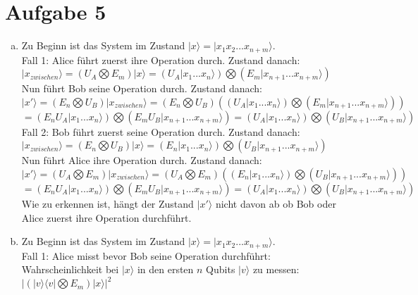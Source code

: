 \documentclass[a4paper]{scrartcl}
\begin{document}
\section*{Aufgabe 5}
\begin{enumerate}[a)]

\item Zu Beginn ist das System im Zustand $|x\rangle =|x_1x_2...x_{n+m}\rangle$. \\
Fall 1: Alice führt zuerst ihre Operation durch. Zustand danach:\\
$|x_{zwischen}\rangle=(U_A\bigotimes E_{m})|x\rangle = (U_A|x_1...x_n\rangle)\bigotimes (E_{m}|x_{n+1}...x_{n+m}\rangle)$\\
Nun führt Bob seine Operation durch. Zustand danach:\\
$|x'\rangle = (E_n\bigotimes U_B)|x_{zwischen}\rangle= (E_n\bigotimes U_B) ((U_A|x_1...x_n\rangle)\bigotimes (E_{m}|x_{n+1}...x_{n+m}\rangle))$\\
$= (E_nU_A|x_1...x_n\rangle)\bigotimes (E_mU_B|x_{n+1}...x_{n+m}\rangle)=(U_A|x_1...x_n\rangle)\bigotimes (U_B|x_{n+1}...x_{n+m}\rangle) $\\

\noindent Fall 2: Bob führt zuerst seine Operation durch. Zustand danach:\\
$|x_{zwischen}\rangle=(E_n \bigotimes U_B)|x\rangle = (E_n|x_1...x_n\rangle)\bigotimes (U_B|x_{n+1}...x_{n+m}\rangle)$\\
Nun führt Alice ihre Operation durch. Zustand danach:\\
$|x'\rangle = (U_A\bigotimes E_m)|x_{zwischen}\rangle= (U_A\bigotimes E_m) ((E_n|x_1...x_n\rangle)\bigotimes (U_B|x_{n+1}...x_{n+m}\rangle))$\\
$= (E_nU_A|x_1...x_n\rangle)\bigotimes (E_mU_B|x_{n+1}...x_{n+m}\rangle)=(U_A|x_1...x_n\rangle)\bigotimes (U_B|x_{n+1}...x_{n+m}\rangle)$\\
Wie zu erkennen ist, hängt der Zustand $|x'\rangle$ nicht davon ab ob Bob oder Alice zuerst ihre Operation durchführt.

\item Zu Beginn ist das System im Zustand $|x\rangle =|x_1x_2...x_{n+m}\rangle$. \\
Fall 1: Alice misst bevor Bob seine Operation durchführt:\\
Wahrscheinlichkeit bei $|x\rangle$ in den ersten $n$ Qubits $|v\rangle$ zu messen: $|(|v\rangle \langle v|\bigotimes E_m)|x\rangle|^2$\\\\


\end{enumerate}
\end{document}
